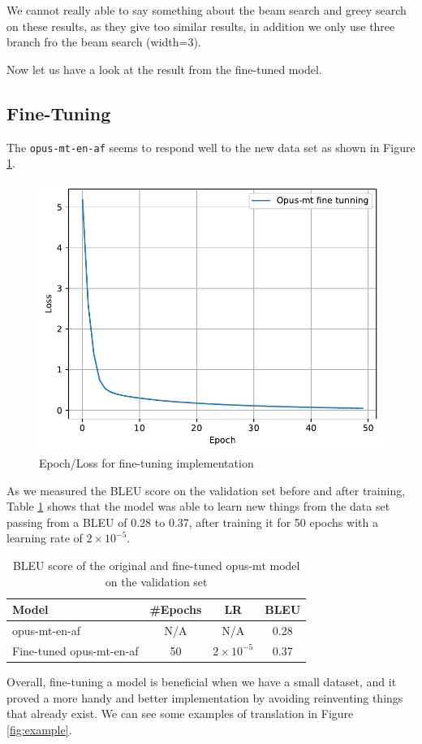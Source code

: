 We cannot really able to say something about the beam search and greey search on these results, as they give too similar results, in addition we only use three branch fro the beam search (width=3).

Now let us have a look at the result from the fine-tuned model.

\subsection{Fine-Tuning}
The \texttt{opus-mt-en-af} seems to respond well to the new data set as shown in Figure \ref{fig:loss2}.
\begin{figure}[H]
	\centering
	\includegraphics[width=0.8\linewidth]{./figures/fine_tunning.pdf}
	\caption{Epoch/Loss for fine-tuning implementation}
	\label{fig:loss2}
\end{figure}

As we measured the BLEU score on the validation set before and after training, Table \ref{tab:fine} shows that the model was able to learn new things from the data set passing from a BLEU of 0.28 to 0.37, after training it for 50 epochs with a learning rate of $2\times 10 ^{-5}$.

\begin{table}
	\centering
	\begin{tabular}{lccc}
		\toprule
		Model                 & \#Epochs & LR              & BLEU \\
		\midrule
		opus-mt-en-af         & N/A      & N/A             & 0.28 \\
		Fine-tuned opus-mt-en-af & 50      & $2\times10^{-5}$ & 0.37 \\
		\bottomrule
	\end{tabular}
	\caption{BLEU score of the original and fine-tuned opus-mt model on the validation set}
	\label{tab:fine}
\end{table}
Overall,  fine-tuning a model is beneficial when we have a small dataset, and it proved a more handy and better implementation by avoiding reinventing things that already exist. We can see some examples of translation in Figure \ref{fig:example}.

